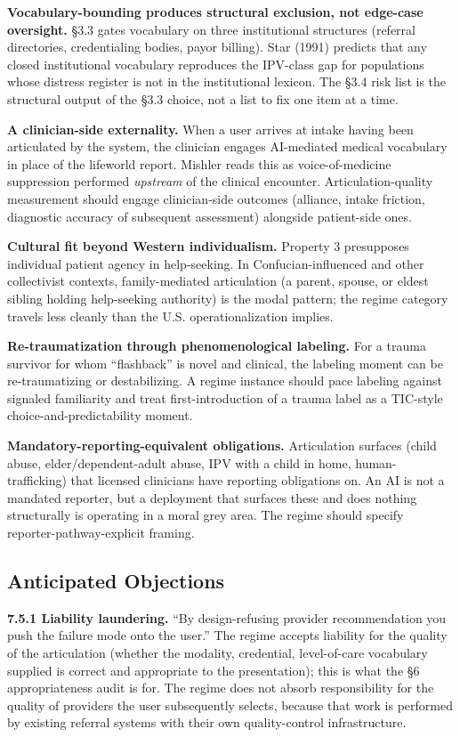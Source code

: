 \documentclass[letterpaper]{article}
\begin{document}
\textbf{Vocabulary-bounding produces structural exclusion, not edge-case oversight.} \S3.3 gates vocabulary on three institutional structures (referral directories, credentialing bodies, payor billing). Star (1991) \citep{star1991power} predicts that any closed institutional vocabulary reproduces the IPV-class gap for populations whose distress register is not in the institutional lexicon. The \S3.4 risk list is the structural output of the \S3.3 choice, not a list to fix one item at a time.

\textbf{A clinician-side externality.} When a user arrives at intake having been articulated by the system, the clinician engages AI-mediated medical vocabulary in place of the lifeworld report. Mishler \citep{mishler1984discourse} reads this as voice-of-medicine suppression performed \emph{upstream} of the clinical encounter. Articulation-quality measurement should engage clinician-side outcomes (alliance, intake friction, diagnostic accuracy of subsequent assessment) alongside patient-side ones.

\textbf{Cultural fit beyond Western individualism.} Property 3 presupposes individual patient agency in help-seeking. In Confucian-influenced and other collectivist contexts, family-mediated articulation (a parent, spouse, or eldest sibling holding help-seeking authority) is the modal pattern; the regime category travels less cleanly than the U.S. operationalization implies.

\textbf{Re-traumatization through phenomenological labeling.} For a trauma survivor for whom ``flashback'' is novel and clinical, the labeling moment can be re-traumatizing or destabilizing. A regime instance should pace labeling against signaled familiarity and treat first-introduction of a trauma label as a TIC-style choice-and-predictability moment.

\textbf{Mandatory-reporting-equivalent obligations.} Articulation surfaces (child abuse, elder/dependent-adult abuse, IPV with a child in home, human-trafficking) that licensed clinicians have reporting obligations on. An AI is not a mandated reporter, but a deployment that surfaces these and does nothing structurally is operating in a moral grey area. The regime should specify reporter-pathway-explicit framing.

\subsection{Anticipated Objections}

\textbf{7.5.1 Liability laundering.} ``By design-refusing provider recommendation you push the failure mode onto the user.'' The regime accepts liability for the quality of the articulation (whether the modality, credential, level-of-care vocabulary supplied is correct and appropriate to the presentation); this is what the \S6 appropriateness audit is for. The regime does not absorb responsibility for the quality of providers the user subsequently selects, because that work is performed by existing referral systems with their own quality-control infrastructure.
\end{document}
